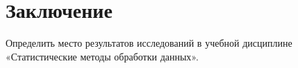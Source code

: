 \chapter*{Заключение}

Определить место результатов исследований в учебной дисциплине
«Статистические методы обработки данных».
